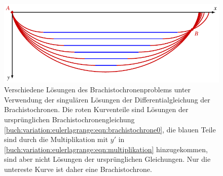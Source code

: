 %
%
%
\begin{figure}
\centering
\includegraphics{chapters/020-variation/images/singulaer.pdf}
\caption{Verschiedene Lösungen des Brachistochronenproblems
unter Verwendung der singulären Lösungen
der Differentialgleichung der Brachistochronen.
Die roten Kurventeile sind Lösungen der ursprünglichen
Brachistochronengleichung
\eqref{buch:variation:eulerlagrange:eqn:brachistochrone0},
die blauen Teile sind durch die Multiplikation mit $y'$ in
\eqref{buch:variation:eulerlagrange:eqn:multiplikation}
hinzugekommen, sind aber nicht Lösungen der ursprünglichen
Gleichungen.
Nur die untereste Kurve ist daher eine Brachistochrone.
\label{buch:variation:eulerlagrange:fig:brachloes}}
\end{figure}
